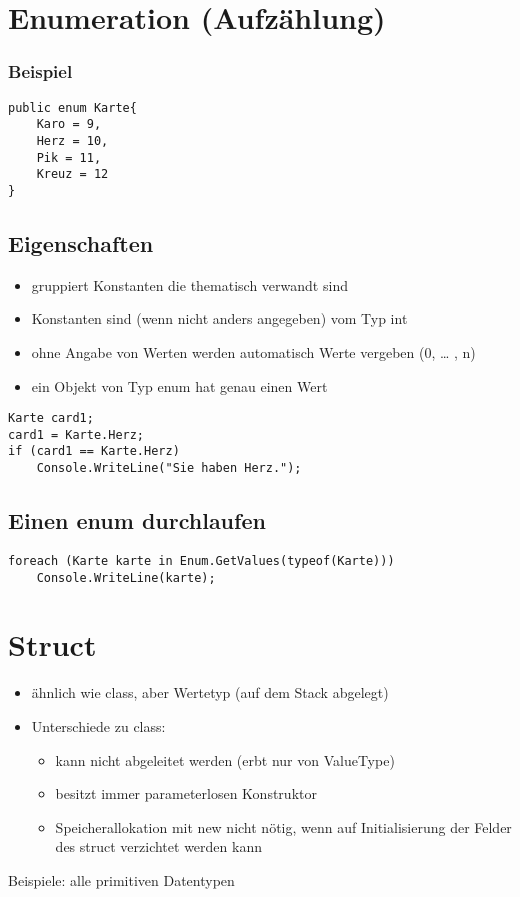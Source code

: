 \section{Enumeration (Aufzählung)}

\subsubsection*{Beispiel}
\begin{lstlisting}[language={[Sharp]C}]
public enum Karte{
	Karo = 9,
	Herz = 10,
	Pik = 11,
	Kreuz = 12
}
\end{lstlisting}

\subsection{Eigenschaften}

\begin{itemize}
\item gruppiert Konstanten die thematisch verwandt sind
\item Konstanten sind (wenn nicht anders angegeben) vom Typ int
\item ohne Angabe von Werten werden automatisch Werte vergeben (0, … , n)
\item ein Objekt von Typ enum hat genau einen Wert
\end{itemize}
\begin{lstlisting}[language={[Sharp]C}]
Karte card1;
card1 = Karte.Herz;
if (card1 == Karte.Herz)
	Console.WriteLine("Sie haben Herz.");
\end{lstlisting}

\subsection{Einen enum durchlaufen}
\begin{lstlisting}[language={[Sharp]C}]
foreach (Karte karte in Enum.GetValues(typeof(Karte)))
	Console.WriteLine(karte);
\end{lstlisting}

\section{Struct}

\begin{itemize}
\item ähnlich wie class, aber Wertetyp (auf dem Stack abgelegt)
\item Unterschiede zu class:
\begin{itemize}
\item kann nicht abgeleitet werden (erbt nur von ValueType)
\item besitzt immer parameterlosen Konstruktor
\item Speicherallokation mit new nicht nötig, wenn auf Initialisierung der Felder des struct verzichtet werden kann
\end{itemize}
\end{itemize}
Beispiele: alle primitiven Datentypen

